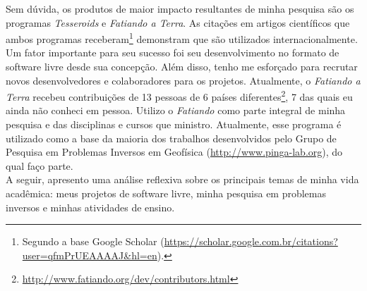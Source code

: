 Sem dúvida, os produtos de maior impacto resultantes de minha pesquisa são os
programas {\em Tesseroids} e {\em Fatiando a Terra}.
As citações em artigos científicos que ambos programas
receberam\footnote{Segundo a base Google Scholar
(\url{https://scholar.google.com.br/citations?user=qfmPrUEAAAAJ&hl=en}).}
demonstram que são utilizados internacionalmente.
Um fator importante para seu sucesso foi seu desenvolvimento no formato de
software livre desde sua concepção.
Além disso, tenho me esforçado para recrutar novos desenvolvedores e
colaboradores para os projetos.
Atualmente, o {\em Fatiando a Terra} recebeu contribuições de 13 pessoas de 6
países
diferentes\footnote{\url{http://www.fatiando.org/dev/contributors.html}},
7 das quais eu ainda não conheci em pessoa.
Utilizo o {\em Fatiando} como parte integral de minha pesquisa e das
disciplinas e cursos que ministro.
Atualmente, esse programa é utilizado como a base da maioria dos trabalhos
desenvolvidos pelo Grupo de Pesquisa em Problemas Inversos em Geofísica
(\url{http://www.pinga-lab.org}), do qual faço parte.
\\[0.5cm]

A seguir, apresento uma análise reflexiva sobre os principais temas de minha
vida acadêmica: meus projetos de software livre, minha pesquisa em problemas
inversos e minhas atividades de ensino.
